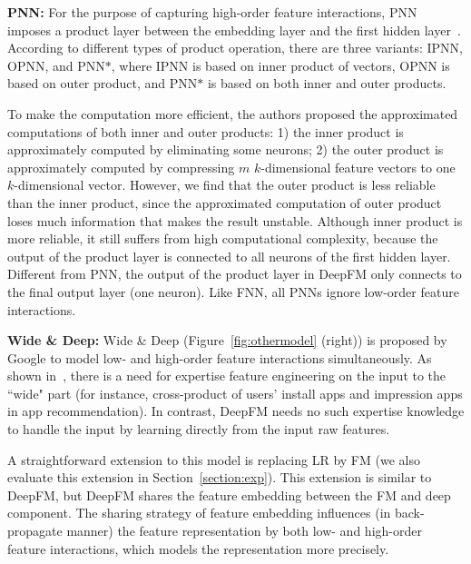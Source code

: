 \noindent\textbf{PNN:} For the purpose of capturing high-order feature interactions, PNN imposes a product layer between the embedding layer and the first hidden layer~\cite{pnn}. According to different types of product operation, there are three variants: IPNN, OPNN, and PNN$\ast$, where IPNN is based on inner product of vectors, OPNN is based on outer product, and PNN$\ast$ is based on both inner and outer products.

To make the computation more efficient, the authors proposed the approximated computations of both inner and outer products: 1) the inner product is approximately computed by eliminating some neurons; 2) the outer product is approximately computed by compressing $m$ $k$-dimensional feature vectors to one $k$-dimensional vector. However, we find that the outer product is less reliable than the inner product, since the approximated computation of outer product loses much information that makes the result unstable. Although inner product is more reliable, it still suffers from high computational complexity, because the output of the product layer is connected to all neurons of the first hidden layer. Different from PNN, the output of the product layer in DeepFM only connects to the final output layer (one neuron). Like FNN, all PNNs ignore low-order feature interactions.



\noindent\textbf{Wide \& Deep:} Wide \& Deep (Figure~\ref{fig:othermodel} (right)) is proposed by Google to model low- and high-order feature interactions simultaneously. As shown in~\cite{wide-n-deep}, there is a need for expertise feature engineering on the input to the ``wide" part (for instance, cross-product of users' install apps and impression apps in app recommendation). In contrast, DeepFM needs no such expertise knowledge to handle the input by learning directly from the input raw features.

A straightforward extension to this model is replacing LR by FM  (we also evaluate this extension in Section~\ref{section:exp}). This extension is similar to DeepFM, but DeepFM shares the feature embedding between the FM and deep component. The sharing strategy of feature embedding influences (in back-propagate manner) the feature representation by both low- and high-order feature interactions, which models the representation more precisely.


